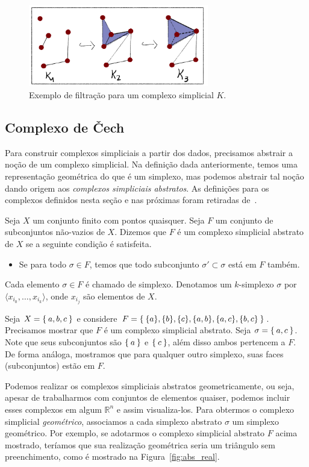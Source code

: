 \begin{figure}[!htpb]
  \centering
  \includegraphics[width=0.7\textwidth]{images/filtracao_exemplo.png}
  \caption{Exemplo de filtração para um complexo simplicial $K$.}
  \label{fig:filtracao_exemplo}
  \fautor
\end{figure}


\subsection{Complexo de \v{C}ech}
Para construir complexos simpliciais a partir dos dados, precisamos abstrair
a noção de um complexo simplicial. Na definição dada anteriormente, temos uma
representação geométrica do que é um simplexo, mas podemos abstrair tal noção
dando origem aos \textit{complexos simpliciais abstratos}. As definições para
os complexos definidos nesta seção e nas próximas foram retiradas de~\cite{edelsbrunner2010computational}.
\begin{defi}
  Seja $X$ um conjunto finito com pontos quaisquer. Seja $F$ um conjunto de
  subconjuntos não-vazios de $X$. Dizemos que $F$ é um complexo simplicial abstrato de
  $X$ se a seguinte condição é satisfeita.
  \begin{itemize}
    \item Se para todo $\sigma \in F$, temos que todo subconjunto
          $\sigma' \subset \sigma$ está em $F$ também.
  \end{itemize}
  Cada elemento $\sigma \in F$ é chamado de simplexo. Denotamos um $k$-simplexo $\sigma$ por $\langle x_{i_0}, \dots, x_{i_k} \rangle$, onde $x_{i_j}$ são elementos de $X$.
\end{defi}

\begin{ex}
  Seja $X=\Set{a,b,c}$ e considere $F=\Set{\{a \}, \{b \}, \{c \},
  \{a,b \}, \{a,c \}, \{b,c \}}$. Precisamos mostrar que $F$ é um complexo
  simplicial abstrato. Seja $\sigma=\Set{a,c}$. Note que seus subconjuntos são
  $\Set{a}$ e $\Set{c}$, além disso ambos pertencem a $F$. De forma análoga, mostramos
  que para qualquer outro simplexo, suas faces (subconjuntos) estão em $F$.
\end{ex}
Podemos realizar os complexos simpliciais abstratos geometricamente, ou seja,
apesar de trabalharmos com conjuntos de elementos quaiser, podemos incluir
esses complexos em algum $\mathbb{R}^n$ e assim visualiza-los. Para obtermos
o complexo simplicial \textit{geométrico}, associamos a cada simplexo abstrato $\sigma$
um simplexo geométrico. Por exemplo, se adotarmos o complexo simplicial abstrato
$F$ acima mostrado, teríamos que sua realização geométrica seria um triângulo
sem preenchimento, como é mostrado na Figura~\ref{fig:abs_real}.

